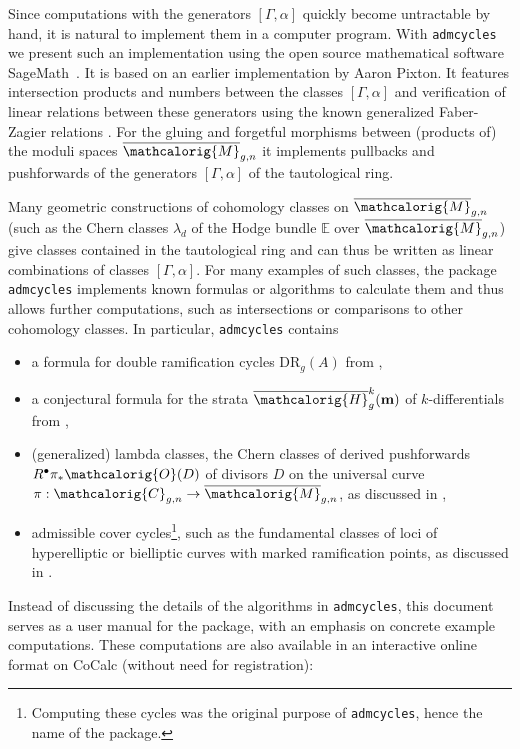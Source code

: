 \documentclass[11pt]{article}
\newcommand{\M}{\ensuremath{\overline{\mathcalorig{M}}}}
\newcommand{\DR}{\mathrm{DR}}
\newcommand{\Sage}{SageMath}
\newcommand{\cocalc}{CoCalc}
\newcommand{\admcycles}{\texttt{admcycles}}
\begin{document}
Since computations with the generators $[\Gamma, \alpha]$ quickly become untractable by hand, it is natural to implement them in a computer program. With \admcycles{} we present such an implementation using the open source mathematical software \Sage{}~\cite{sage}. It is based on an earlier implementation by Aaron Pixton. It features intersection products and numbers between the classes $[\Gamma, \alpha]$ and verification of linear relations between these generators using the known generalized Faber-Zagier relations \cite{pixtonrels,pandhapixton,jandarels}. For the gluing and forgetful morphisms between (products of) the moduli spaces $\M_{g,n}$ it implements pullbacks and pushforwards of the generators $[\Gamma, \alpha]$ of the tautological ring.

Many geometric constructions of cohomology classes on $\M_{g,n}$ (such as the Chern classes $\lambda_d$ of the Hodge bundle $\mathbb{E}$ over $\M_{g,n}$) give classes contained in the tautological ring and can thus be written as linear combinations of classes $[\Gamma, \alpha]$. For many examples of such classes, the package \admcycles{} implements known formulas or algorithms to calculate them and thus allows further computations, such as intersections or comparisons to other cohomology classes. In particular, \admcycles{} contains
\begin{itemize}
    \item a formula for double ramification cycles $\DR_g(A)$ from \cite{Janda2016Double-ramifica} ,
    \item a conjectural formula for the strata $\overline{\mathcalorig{H}}_g^k(\textbf{m})$ of $k$-differentials from \cite{FP,SchmittDimension},
    \item (generalized) lambda classes, the Chern classes of derived pushforwards $R^\bullet \pi_* \mathcalorig{O}(D)$ of divisors $D$ on the universal curve $\pi: \mathcalorig{C}_{g,n} \to \M_{g,n}$, as discussed in \cite{PRvZ},
    \item admissible cover cycles\footnote{Computing these cycles was the original purpose of \texttt{admcycles}, hence the name of the package.}, such as the fundamental classes of loci of hyperelliptic or bielliptic curves with marked ramification points, as discussed in \cite{schmittvanzelm}.
\end{itemize}
Instead of discussing the details of the algorithms in \admcycles{}, this document serves as a user manual for the package, with an emphasis on concrete example computations. These computations are also available in an interactive online format on \cocalc{} (without need for registration):
\end{document}
